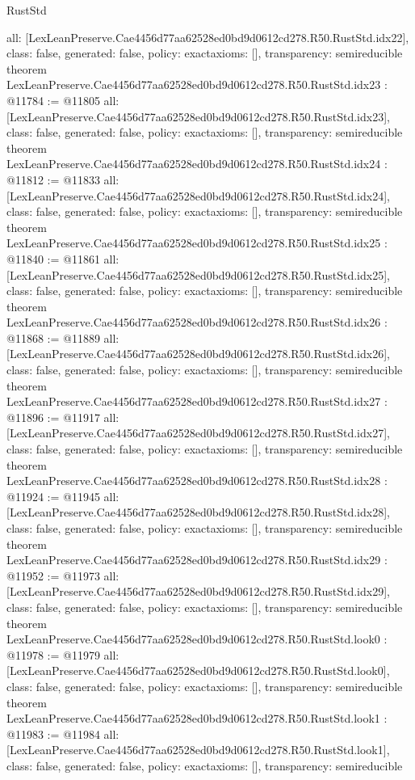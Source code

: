 \begin{lexlean}{RustStd}
\begin{coremodule}
{  all: [LexLeanPreserve.Cae4456d77aa62528ed0bd9d0612cd278.R50.RustStd.idx22],
  class: false,
  generated: false,
  policy: exact{axioms: []},
  transparency: semireducible
}
theorem LexLeanPreserve.Cae4456d77aa62528ed0bd9d0612cd278.R50.RustStd.idx23 : @11784 := @11805 {
  all: [LexLeanPreserve.Cae4456d77aa62528ed0bd9d0612cd278.R50.RustStd.idx23],
  class: false,
  generated: false,
  policy: exact{axioms: []},
  transparency: semireducible
}
theorem LexLeanPreserve.Cae4456d77aa62528ed0bd9d0612cd278.R50.RustStd.idx24 : @11812 := @11833 {
  all: [LexLeanPreserve.Cae4456d77aa62528ed0bd9d0612cd278.R50.RustStd.idx24],
  class: false,
  generated: false,
  policy: exact{axioms: []},
  transparency: semireducible
}
theorem LexLeanPreserve.Cae4456d77aa62528ed0bd9d0612cd278.R50.RustStd.idx25 : @11840 := @11861 {
  all: [LexLeanPreserve.Cae4456d77aa62528ed0bd9d0612cd278.R50.RustStd.idx25],
  class: false,
  generated: false,
  policy: exact{axioms: []},
  transparency: semireducible
}
theorem LexLeanPreserve.Cae4456d77aa62528ed0bd9d0612cd278.R50.RustStd.idx26 : @11868 := @11889 {
  all: [LexLeanPreserve.Cae4456d77aa62528ed0bd9d0612cd278.R50.RustStd.idx26],
  class: false,
  generated: false,
  policy: exact{axioms: []},
  transparency: semireducible
}
theorem LexLeanPreserve.Cae4456d77aa62528ed0bd9d0612cd278.R50.RustStd.idx27 : @11896 := @11917 {
  all: [LexLeanPreserve.Cae4456d77aa62528ed0bd9d0612cd278.R50.RustStd.idx27],
  class: false,
  generated: false,
  policy: exact{axioms: []},
  transparency: semireducible
}
theorem LexLeanPreserve.Cae4456d77aa62528ed0bd9d0612cd278.R50.RustStd.idx28 : @11924 := @11945 {
  all: [LexLeanPreserve.Cae4456d77aa62528ed0bd9d0612cd278.R50.RustStd.idx28],
  class: false,
  generated: false,
  policy: exact{axioms: []},
  transparency: semireducible
}
theorem LexLeanPreserve.Cae4456d77aa62528ed0bd9d0612cd278.R50.RustStd.idx29 : @11952 := @11973 {
  all: [LexLeanPreserve.Cae4456d77aa62528ed0bd9d0612cd278.R50.RustStd.idx29],
  class: false,
  generated: false,
  policy: exact{axioms: []},
  transparency: semireducible
}
theorem LexLeanPreserve.Cae4456d77aa62528ed0bd9d0612cd278.R50.RustStd.look0 : @11978 := @11979 {
  all: [LexLeanPreserve.Cae4456d77aa62528ed0bd9d0612cd278.R50.RustStd.look0],
  class: false,
  generated: false,
  policy: exact{axioms: []},
  transparency: semireducible
}
theorem LexLeanPreserve.Cae4456d77aa62528ed0bd9d0612cd278.R50.RustStd.look1 : @11983 := @11984 {
  all: [LexLeanPreserve.Cae4456d77aa62528ed0bd9d0612cd278.R50.RustStd.look1],
  class: false,
  generated: false,
  policy: exact{axioms: []},
  transparency: semireducible
}
\end{coremodule}
\end{lexlean}
